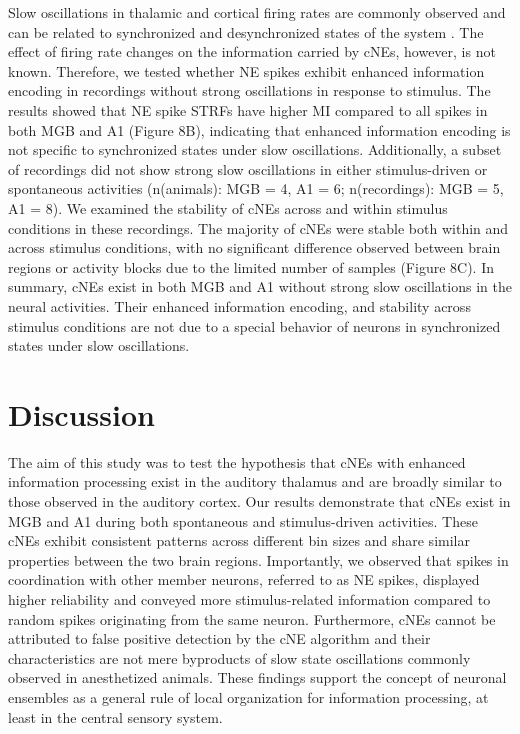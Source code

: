 \documentclass[11pt]{article}
\begin{document}
Slow oscillations in thalamic and cortical firing rates are commonly observed and can be related to synchronized and desynchronized states of the system \citep{metherate1993nucleus, steriade1993thalamocortical, cowan1994spontaneous, sanchez2000cellular, hasenstaub2007state}. The effect of firing rate changes on the information carried by cNEs, however, is not known. Therefore, we tested whether NE spikes exhibit enhanced information encoding in recordings without strong oscillations in response to stimulus. The results showed that NE spike STRFs have higher MI compared to all spikes in both MGB and A1 (Figure 8B), indicating that enhanced information encoding is not specific to synchronized states under slow oscillations. Additionally, a subset of recordings did not show strong slow oscillations in either stimulus-driven or spontaneous activities (n(animals): MGB = 4, A1 = 6; n(recordings): MGB = 5, A1 = 8). We examined the stability of cNEs across and within stimulus conditions in these recordings. The majority of cNEs were stable both within and across stimulus conditions, with no significant difference observed between brain regions or activity blocks due to the limited number of samples (Figure 8C). In summary, cNEs exist in both MGB and A1 without strong slow oscillations in the neural activities. Their enhanced information encoding, and stability across stimulus conditions are not due to a special behavior of neurons in synchronized states under slow oscillations.

\section*{Discussion}
\begin{comment}
(1500 Words Maximum)
The discussion section should be as concise as possible and include a brief statement of the principal findings, a discussion of the validity of the observations, a discussion of the findings in light of other published work dealing with the same or closely related subjects, and a statement of the possible significance of the work. Extensive discussion of the literature is discouraged.
\end{comment}
The aim of this study was to test the hypothesis that cNEs with enhanced information processing exist in the auditory thalamus and are broadly similar to those observed in the auditory cortex. Our results demonstrate that cNEs exist in MGB and A1 during both spontaneous and stimulus-driven activities. These cNEs exhibit consistent patterns across different bin sizes and share similar properties between the two brain regions. Importantly, we observed that spikes in coordination with other member neurons, referred to as NE spikes, displayed higher reliability and conveyed more stimulus-related information compared to random spikes originating from the same neuron. Furthermore, cNEs cannot be attributed to false positive detection by the cNE algorithm and their characteristics are not mere byproducts of slow state oscillations commonly observed in anesthetized animals. These findings support the concept of neuronal ensembles as a general rule of local organization for information processing, at least in the central sensory system.
\end{document}
